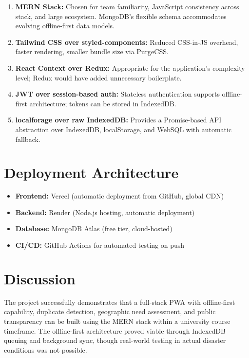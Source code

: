 \begin{enumerate}[leftmargin=1.2cm]
    \item \textbf{MERN Stack:} Chosen for team familiarity, JavaScript consistency across stack, and large ecosystem. MongoDB's flexible schema accommodates evolving offline-first data models.
    \item \textbf{Tailwind CSS over styled-components:} Reduced CSS-in-JS overhead, faster rendering, smaller bundle size via PurgeCSS.
    \item \textbf{React Context over Redux:} Appropriate for the application's complexity level; Redux would have added unnecessary boilerplate.
    \item \textbf{JWT over session-based auth:} Stateless authentication supports offline-first architecture; tokens can be stored in IndexedDB.
    \item \textbf{localforage over raw IndexedDB:} Provides a Promise-based API abstraction over IndexedDB, localStorage, and WebSQL with automatic fallback.
\end{enumerate}

\section{Deployment Architecture}

\begin{itemize}[leftmargin=1.2cm]
    \item \textbf{Frontend:} Vercel (automatic deployment from GitHub, global CDN)
    \item \textbf{Backend:} Render (Node.js hosting, automatic deployment)
    \item \textbf{Database:} MongoDB Atlas (free tier, cloud-hosted)
    \item \textbf{CI/CD:} GitHub Actions for automated testing on push
\end{itemize}

\section{Discussion}

The project successfully demonstrates that a full-stack PWA with offline-first capability, duplicate detection, geographic need assessment, and public transparency can be built using the MERN stack within a university course timeframe. The offline-first architecture proved viable through IndexedDB queuing and background sync, though real-world testing in actual disaster conditions was not possible.

